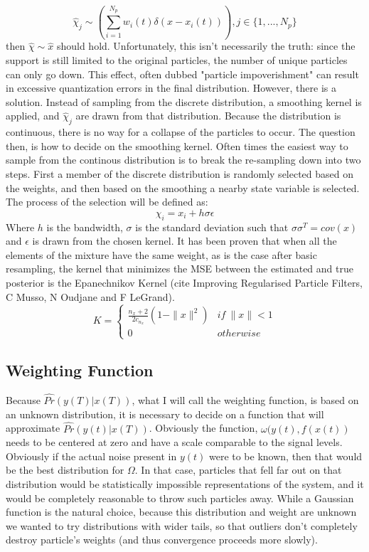\begin{equation}
\hat{\chi}_j \sim \left(\sum_{i=1}^{N_p} w_i(t)\delta(x - x_i(t))\right), j \in \{1, ..., N_p\}
\end{equation}
then $\hat{\chi} \sim \hat{x}$ should hold. Unfortunately, this isn't necessarily the truth: since the support is
still limited to the original particles, the number of unique particles can only go down.
This effect, often dubbed "particle impoverishment" can result in excessive quantization
errors in the final distribution. However, there is a solution. Instead of sampling from the
discrete distribution, a smoothing kernel is applied, and $\hat{\chi}_j$ are drawn from
that distribution. Because the distribution is continuous, there is no way for a collapse
of the particles to occur. The question then, is how to decide on the smoothing kernel. 
Often times the easiest way to sample from the continous distribution is to break the 
re-sampling down into two steps. First a member of the discrete distribution is randomly
selected based on the weights, and then based on the smoothing a nearby state variable 
is selected. The process of the selection will be defined as:
\begin{equation}
\chi_i = x_i + h\sigma \epsilon
\end{equation}
Where $h$ is the bandwidth, $\sigma$ is the standard deviation such that $\sigma \sigma^T = cov(x)$
and $\epsilon$ is drawn from the chosen kernel.
It has been proven that when all the elements of the mixture
have the same weight, as is the case after basic resampling, the kernel that minimizes the 
MSE between the estimated and true posterior is the Epanechnikov Kernel (cite Improving Regularised
Particle Filters, C Musso, N Oudjane and F LeGrand). 
\begin{equation}
K = \left\{
\begin{array}{lr}
\frac{n_x+2}{2c_{n_x}}(1-\|x\|^2) & if\ \|x\| < 1\\
0 & otherwise
\end{array}\right.
\end{equation}

\subsection{Weighting Function}
Because $\hat{Pr}(y(T) | x(T))$, what I will call the weighting function,
is based on an unknown distribution, it is necessary to decide on a function
that will approximate $\hat{Pr}(y(t) | x(T))$. Obviously the function, $\omega(y(t), f(x(t))$
needs to be centered at zero and have a scale comparable to the signal levels.
Obviously if the actual noise present in $y(t)$ were to be known, then that would
be the best distribution for $\Omega$. In that case, particles that fell
far out on that distribution would be statistically impossible representations
of the system, and it would be completely reasonable to throw such particles away.
While a Gaussian function is the natural choice, because this distribution
and weight are unknown we wanted to try distributions
with wider tails, so that outliers don't completely destroy particle's weights
(and thus convergence proceeds more slowly).

